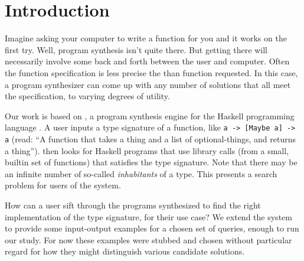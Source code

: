 \section{Introduction}

Imagine asking your computer to write a function for you and it works on the
first try.
%
Well, program synthesis isn't quite there.
%
But getting there will necessarily involve some back and forth between the user
and computer.
%
Often the function specification is less precise the than function requested.
%
In this case, a program synthesizer can come up with any number of solutions
that all meet the specification, to varying degrees of utility.

Our work is based on \hoogleplus, a program synthesis engine for the
Haskell programming language \cite{hoogle_plus_2020}.
%
A user inputs a type signature of a function, like \texttt{a -> [Maybe a] -> a}
(read: ``A function that takes a thing and a list of optional-things, and
returns a thing'').
%
\hoogleplus then looks for Haskell programs that use library calls (from
a small, builtin set of functions) that satisfies the type signature.
%
Note that there may be an infinite number of so-called \emph{inhabitants} of a type.
%
This presents a search problem for users of the system.

How can a user sift through the programs synthesized to find the right
implementation of the type signature, for their use case?
%
We extend the system to provide some input-output examples for a chosen set of
queries, enough to run our study.
%
For now these examples were stubbed and chosen without particular regard for how
they might distinguish various candidate solutions.
%

